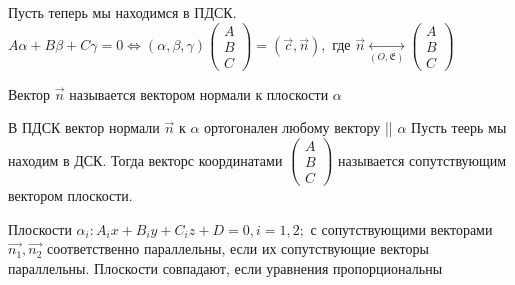 Пусть теперь мы находимся в ПДСК. \newline
\(A\alpha+B\beta+C\gamma = 0 \Longleftrightarrow (\alpha, \beta, \gamma)\begin{pmatrix}
	A \\ B \\ C
\end{pmatrix} = (\vec c, \vec n), \text{ где } \vec n \underset{(O, \mathfrak{E})}{\longleftrightarrow}\begin{pmatrix}
A \\ B \\ C
\end{pmatrix}\)
\begin{definition}
	Вектор $\vec{n}$ называется вектором нормали к плоскости $\alpha$
\end{definition}
\begin{proposition}
	В ПДСК вектор нормали $\vec{n}$ к $\alpha$ ортогонален любому вектору || $\alpha$ \newline
	Пусть теерь мы находим в ДСК. Тогда векторс координатами $\begin{pmatrix}
		A \\ B\\ C
	\end{pmatrix}$ называется сопутствующим вектором плоскости.
\end{proposition}
\begin{proposition}
	Плоскости \(\alpha_i: A_ix+B_iy+C_iz+D = 0, i= 1,2;\) с сопутствующими векторами \(\vec{n_1}, \vec{n_2}\) соответственно параллельны, если их сопутствующие векторы параллельны. Плоскости совпадают, если уравнения пропорциональны
\end{proposition}
